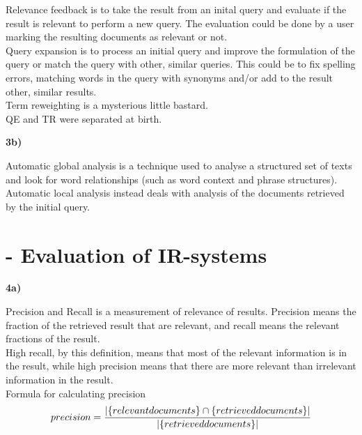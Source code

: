 \documentclass[a4paper, norsk, 11pt]{scrartcl} %
\numberwithin{equation}{section} %
\numberwithin{figure}{section} %
\numberwithin{table}{section} %
\begin{document}
Relevance feedback is to take the result from an inital query and evaluate if the result is relevant to perform a new query. The evaluation could be done by a user marking the resulting documents as relevant or not.\\

Query expansion is to process an initial query and improve the formulation of the query or match the query with other, similar queries. This could be to fix spelling errors, matching words in the query with synonyms and/or add to the result other, similar results.\\

Term reweighting is a mysterious little bastard.\\

QE and TR were separated at birth.

\vspace{22pt}


\textbf{3b)}

Automatic global analysis is a technique used to analyse a structured set of texts and look for word relationships (such as word context and phrase structures). Automatic local analysis instead deals with analysis of the documents retrieved by the initial query.



\newpage

\section{- Evaluation of IR-systems}

\textbf{4a)}

Precision and Recall is a measurement of relevance of results. Precision means the fraction of the retrieved result that are relevant, and recall means the relevant fractions of the result.\\
High recall, by this definition, means that most of the relevant information is in the result, while high precision means that there are more relevant than irrelevant information in the result.\\

Formula for calculating precision
\begin{equation*}
precision = { {|\{ relevant documents \} \cap \{retrieved documents \} |} \over {| \{ retrieved documents \} |}}
\end{equation*}
\end{document}

